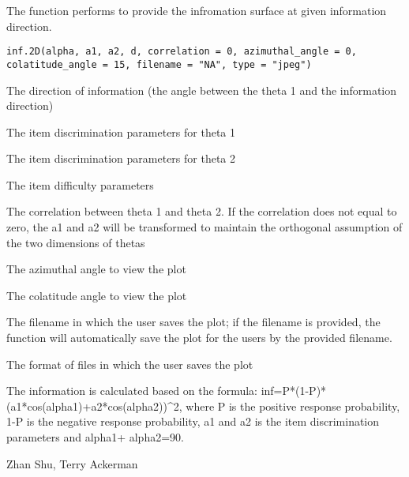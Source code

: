 \begin{Description}\relax
The function performs to provide the infromation surface at given information direction.
\end{Description}
\begin{Usage}
\begin{verbatim}
inf.2D(alpha, a1, a2, d, correlation = 0, azimuthal_angle = 0, colatitude_angle = 15, filename = "NA", type = "jpeg")
\end{verbatim}
\end{Usage}
\begin{Arguments}
\begin{ldescription}
\item[\code{alpha}] The direction of information (the angle between the theta 1 and the information direction) 
\item[\code{a1}] The item discrimination parameters for theta 1 
\item[\code{a2}] The item discrimination parameters for theta 2
\item[\code{d}] The item difficulty parameters
\item[\code{correlation}] The correlation between theta 1 and theta 2. If the correlation does not equal to zero, the a1 and a2 will be transformed to maintain the orthogonal assumption of the two dimensions of thetas 
\item[\code{azimuthal\_angle}] The azimuthal angle to view the plot  
\item[\code{colatitude\_angle}] The colatitude angle to view the plot 
\item[\code{filename}] The filename in which the user saves the plot; if the filename is provided, the function will automatically save the plot for the users by the provided filename. 
\item[\code{type}] The format of files in which the user saves the plot 
\end{ldescription}
\end{Arguments}
\begin{Details}\relax
The information is calculated based on the formula: inf=P*(1-P)*(a1*cos(alpha1)+a2*cos(alpha2))^2, where P is the positive response probability, 1-P is the negative response probability, a1 and a2 is the item discrimination 
parameters and alpha1+ alpha2=90.
\end{Details}
\begin{Author}\relax
Zhan Shu, Terry Ackerman
\end{Author}
